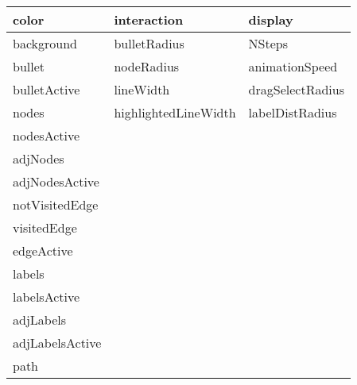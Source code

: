 \documentclass[11pt]{article}
\begin{document}
\begin{center}
\begin{tabular}{|p{4cm}|p{4cm}|p{4cm}|}
  \hline 
  \textbf{color} & \textbf{interaction} & \textbf{display}\\
  \hline
   background       &    bulletRadius          &   NSteps            \\
   bullet           &    nodeRadius            &   animationSpeed    \\
   bulletActive     &    lineWidth             &   dragSelectRadius  \\
   nodes            &    highlightedLineWidth  &   labelDistRadius   \\
   nodesActive      &                          &                     \\
   adjNodes         &                          &                     \\
   adjNodesActive   &                          &                     \\
   notVisitedEdge   &                          &                     \\
   visitedEdge      &                          &                     \\
   edgeActive       &                          &                     \\
   labels           &                          &                     \\
   labelsActive     &                          &                     \\
   adjLabels        &                          &                     \\
   adjLabelsActive  &                          &                     \\
   path             &                          &                     \\
   \hline
\end{tabular}
\end{center}


	
        
        
         
        
   
   
   
    
        
        





\newcommand{\ngwindow}{
\fill [fill=gray!40] (0,0) rectangle (\ww,-0.2);
\fill [fill=brown!10] (0,-0.2) rectangle (\ww,-0.4);
\draw (0,0) rectangle (\ww,-\wh);
\draw (0,-0.2) -- (\ww,-0.2);
\draw (0,-0.4) -- (\ww,-0.4);
}
\end{document}

